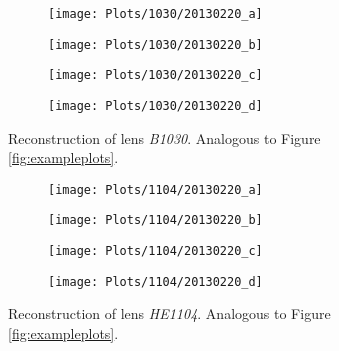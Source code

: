 \documentclass[10pt]{article}
\begin{document}
\begin{figure}[ht!]
 \centering
 \begin{subfigure}{.48\textwidth}
  \centering
  \texttt{[image: Plots/1030/20130220\_a]}
  \caption{}
 \end{subfigure}
 \begin{subfigure}{.48\textwidth}
  \centering
  \texttt{[image: Plots/1030/20130220\_b]}
  \caption{}
 \end{subfigure}
 
 \begin{subfigure}{.48\textwidth}
  \centering
  \texttt{[image: Plots/1030/20130220\_c]}
  \caption{}
 \end{subfigure}
 \begin{subfigure}{.48\textwidth}
  \centering
  \texttt{[image: Plots/1030/20130220\_d]}
  \caption{}
 \end{subfigure}
 \captionsetup{width=.93\textwidth}
 \caption{Reconstruction of lens \textit{B1030}. Analogous to Figure \ref{fig:exampleplots}.}
 \label{fig:1030}
\end{figure}

\begin{figure}[ht!]
 \centering
 \begin{subfigure}{.48\textwidth}
  \centering
  \texttt{[image: Plots/1104/20130220\_a]}
  \caption{}
 \end{subfigure}
 \begin{subfigure}{.48\textwidth}
  \centering
  \texttt{[image: Plots/1104/20130220\_b]}
  \caption{}
 \end{subfigure}
 
 \begin{subfigure}{.48\textwidth}
  \centering
  \texttt{[image: Plots/1104/20130220\_c]}
  \caption{}
 \end{subfigure}
 \begin{subfigure}{.48\textwidth}
  \centering
  \texttt{[image: Plots/1104/20130220\_d]}
  \caption{}
 \end{subfigure}
 \captionsetup{width=.93\textwidth}
 \caption{Reconstruction of lens \textit{HE1104}. Analogous to Figure \ref{fig:exampleplots}.}
 \label{fig:1104}
\end{figure}
\end{document}
